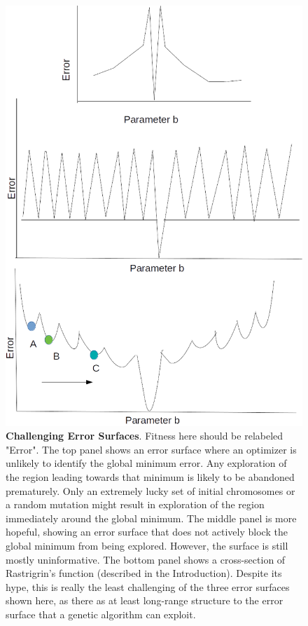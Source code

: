 \begin{figure}
\centering
      \label{fig:test1}
      \centering
      \includegraphics[scale=0.75]{figures/spectrum_worst_error_surfaces_error.png}
      \caption[Challenging Error Surfaces]{\textbf{Challenging Error Surfaces}. 
      Fitness here should be relabeled "Error".
      The top panel shows an error surface where an optimizer is unlikely to identify the global minimum error.
      Any exploration of the region leading towards that minimum is likely to be abandoned prematurely.
      Only an extremely lucky set of initial chromosomes or a random mutation might result in exploration of the region immediately around the global minimum.
      The middle panel is more hopeful, showing an error surface that does not actively block the global minimum from being explored.
      However, the surface is still mostly uninformative.
      The bottom panel shows a cross-section of Rastrigrin's function (described in the Introduction).
      Despite its hype, this is really the least challenging of the three error surfaces shown here, as there as at least long-range structure to the error surface that a genetic algorithm can exploit.
      }
      \label{fig:test2}
\end{figure} 

